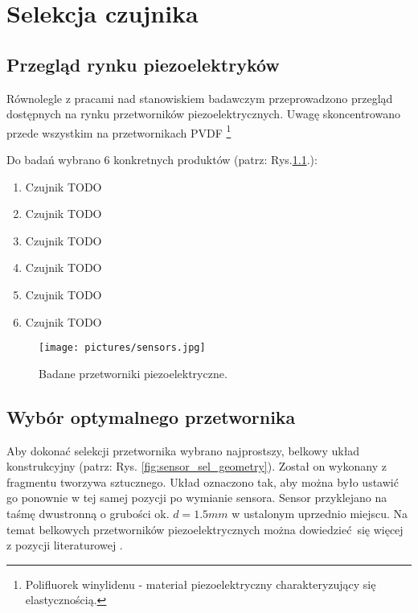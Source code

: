 \chapter{Selekcja czujnika}
\label{sec:sensor_selection}

\section{Przegląd rynku piezoelektryków}
\label{sec:piezoelectric_research}

Równolegle z pracami nad stanowiskiem badawczym przeprowadzono przegląd dostępnych
na rynku przetworników piezoelektrycznych. Uwagę skoncentrowano przede wszystkim 
na przetwornikach PVDF
\footnote{Polifluorek winylidenu - 
materiał piezoelektryczny charakteryzujący się elastycznością.}

Do badań wybrano 6 konkretnych produktów (patrz: Rys.\ref{fig:sensors}.):

\begin{enumerate}
\item Czujnik TODO
\item Czujnik TODO
\item Czujnik TODO
\item Czujnik TODO
\item Czujnik TODO
\item Czujnik TODO
\end{enumerate}


\begin{figure}[tbhp]
\centering
\texttt{[image: pictures/sensors.jpg]}
\caption{Badane przetworniki piezoelektryczne.}
\label{fig:sensors}
\end{figure}

\pagebreak

\section{Wybór optymalnego przetwornika}
\label{sec:optimal_piezoelectric_selection}

Aby dokonać selekcji przetwornika wybrano najprostszy, belkowy układ konstrukcyjny 
(patrz: Rys. \ref{fig:sensor_sel_geometry}). Został on wykonany z fragmentu 
tworzywa sztucznego. Układ oznaczono tak, aby można było ustawić go ponownie 
w tej samej pozycji po wymianie sensora. Sensor przyklejano na taśmę dwustronną 
o grubości ok. $ d = 1.5 mm$ w ustalonym uprzednio miejscu. Na temat
belkowych przetworników piezoelektrycznych można dowiedzieć się więcej 
z pozycji literaturowej \cite{belkowy_sensor}. 


